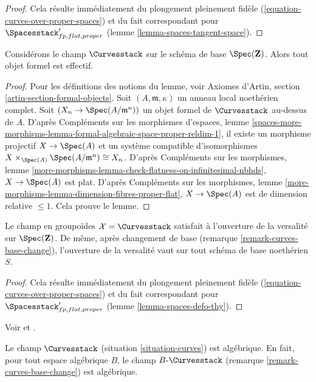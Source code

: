 \begin{proof}
Cela résulte immédiatement du plongement pleinement fidèle
(\ref{equation-curves-over-proper-spaces}) et du fait correspondant pour
$\Spacesstack'_{fp, flat, proper}$
(lemme \ref{lemma-spaces-tangent-space}).
\end{proof}

\begin{lemma}
\label{lemma-curves-existence}
Considérons le champ $\Curvesstack$ sur le schéma de base
$\Spec(\mathbf{Z})$. Alors tout objet formel est effectif.
\end{lemma}

\begin{proof}
Pour les définitions des notions du lemme, voir
Axiomes d'Artin, section \ref{artin-section-formal-objects}.
Soit $(A, \mathfrak m, \kappa)$ un anneau local noethérien complet.
Soit $(X_n \to \Spec(A/\mathfrak m^n))$ un objet formel de
$\Curvesstack$ au-dessus de $A$.
D'après Compléments sur les morphismes d'espaces, lemme
\ref{spaces-more-morphisms-lemma-formal-algebraic-space-proper-reldim-1},
il existe un morphisme projectif $X \to \Spec(A)$ et un système compatible
d'isomorphismes
$X \times_{\Spec(A)} \Spec(A/\mathfrak m^n) \cong X_n$.
D'après Compléments sur les morphismes, lemme
\ref{more-morphisms-lemma-check-flatness-on-infinitesimal-nbhds},
$X \to \Spec(A)$ est plat. D'après Compléments sur les morphismes, lemme
\ref{more-morphisms-lemma-dimension-fibres-proper-flat},
$X \to \Spec(A)$ est de dimension relative $\leq 1$.
Cela prouve le lemme.
\end{proof}

\begin{lemma}
\label{lemma-curves-defo-thy}
Le champ en groupoïdes $\mathcal{X} = \Curvesstack$ satisfait à l'ouverture
de la versalité sur $\Spec(\mathbf{Z})$.
De même, après changement de base (remarque \ref{remark-curves-base-change}),
l'ouverture de la versalité vaut sur tout schéma de base noethérien $S$.
\end{lemma}

\begin{proof}
Cela résulte immédiatement du plongement pleinement fidèle
(\ref{equation-curves-over-proper-spaces}) et du fait correspondant pour
$\Spacesstack'_{fp, flat, proper}$
(lemme \ref{lemma-spaces-defo-thy}).
\end{proof}

\begin{theorem}
\label{theorem-curves-algebraic}
\begin{reference}
Voir \cite[proposition 3.3, page 8]{dJHS} et
\cite[appendice B par Jack Hall, théorème B.1]{Smyth}.
\end{reference}
Le champ $\Curvesstack$ (situation \ref{situation-curves})
est algébrique. En fait, pour tout espace algébrique $B$, le champ
$B\text{-}\Curvesstack$ (remarque \ref{remark-curves-base-change})
est algébrique.
\end{theorem}

